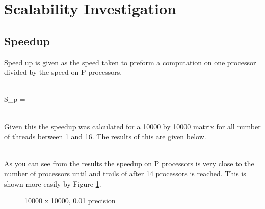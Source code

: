 \documentclass{article}
\begin{document}
\section{Scalability Investigation}
\subsection{Speedup}
Speed up is given as the speed taken to preform a computation on one processor
divided by the speed on P processors.\\~\\
\begin{center}
S_p = \\~\\
\end{center}
Given this the speedup was calculated for a 10000 by 10000 matrix for all number
of threads between 1 and 16. The results of this are given below.\\~\\
\begin{center}
\end{center}

As you can see from the results the speedup on P processors is very close to the
number of processors until and trails of after 14 processors is reached. This is
shown more easily by Figure \ref{fig:speedup}.\\

\begin{figure}[h!]
 \centering
 \caption{10000 x 10000, 0.01 precision}
 \label{fig:speedup}
 \end{figure}\\~\\
\end{document}
